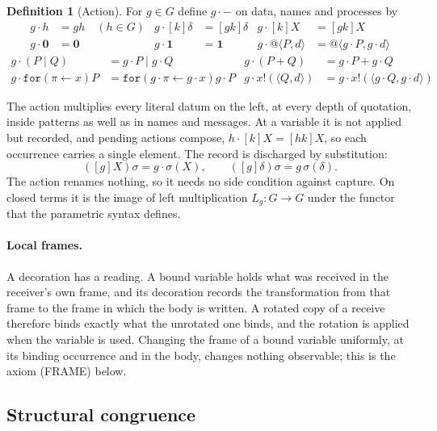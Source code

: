 \documentclass[11pt]{article}
\makeatletter
\theoremstyle{definition}
\newtheorem{definition}[theorem]{Definition}
\theoremstyle{remark}
\newcommand{\nil}{\mathbf{0}}
\newcommand{\chaos}{\mathbf{1}}
\newcommand{\rcv}[3]{\mathtt{for}(#1 \leftarrow #2)#3}
\newcommand{\out}[3]{#1!(\langle #2, #3\rangle)}
\newcommand{\qn}[2]{@\langle #1, #2\rangle}
\newcommand{\act}[2]{#1\cdot #2}
\newcommand{\fr}[2]{[#1]#2}
\makeatother
\begin{document}
\begin{definition}[Action]\label{def:action}
For $g\in G$ define $\act{g}{-}$ on data, names and processes by
\begin{align*}
\act{g}{h} &= gh \quad (h\in G) &
\act{g}{\fr{k}{\delta}} &= \fr{gk}{\delta} &
\act{g}{\fr{k}{X}} &= \fr{gk}{X}\\
\act{g}{\nil} &= \nil &
\act{g}{\chaos} &= \chaos &
\act{g}{\qn{P}{d}} &= \qn{\act{g}{P}}{\act{g}{d}}
\end{align*}
\begin{align*}
\act{g}{(P\mid Q)} &= \act{g}{P}\mid\act{g}{Q} &
\act{g}{(P+Q)} &= \act{g}{P}+\act{g}{Q}\\
\act{g}{\rcv{\pi}{x}{P}} &= \rcv{\act{g}{\pi}}{\act{g}{x}}{\act{g}{P}} &
\act{g}{\out{x}{Q}{d}} &= \out{\act{g}{x}}{\act{g}{Q}}{\act{g}{d}}
\end{align*}
\end{definition}

The action multiplies every literal datum on the left, at every depth of
quotation, inside patterns as well as in names and messages. At a variable it
is not applied but recorded, and pending actions compose,
$\act{h}{\fr{k}{X}}=\fr{hk}{X}$, so each occurrence carries a single element.
The record is discharged by substitution:
\[
(\fr{g}{X})\sigma = \act{g}{\sigma(X)},
\qquad
(\fr{g}{\delta})\sigma = g\,\sigma(\delta).
\]
The action renames nothing, so it needs no side condition against capture.
On closed terms it is the image of left multiplication $L_g : G\to G$ under
the functor that the parametric syntax defines.

\paragraph{Local frames.}
A decoration has a reading. A bound variable holds what was received in the
receiver's own frame, and its decoration records the transformation from that
frame to the frame in which the body is written. A rotated copy of a receive
therefore binds exactly what the unrotated one binds, and the rotation is
applied when the variable is used. Changing the frame of a bound variable
uniformly, at its binding occurrence and in the body, changes nothing
observable; this is the axiom (FRAME) below.

\subsection{Structural congruence}
\end{document}
